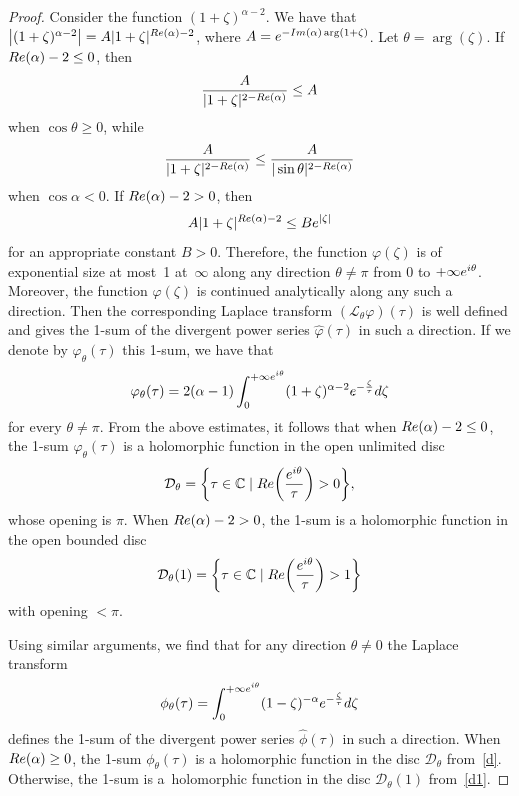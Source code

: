 \documentclass[10pt,a4paper]{article}
\numberwithin{equation}{section}
\begin{document}
\begin{proof}
 Consider the function $(1+\zeta)^{\alpha-2}$. We have that $\bigl|(1+\zeta)^{\alpha-2}\bigr|=A |1+\zeta|^{{\rm Re}(\alpha) -2}$, where
 $A={\rm e}^{-{\rm Im} (\alpha) \arg (1+\zeta)}$. Let $\theta=\arg (\zeta)$. If ${\rm Re} (\alpha) -2 \leq 0$, then
 \[
 \frac{A}{|1+\zeta|^{2 - {\rm Re}(\alpha)}} \leq A
 \]
 when $\cos \theta \geq 0$, while
 \[
 \frac{A}{|1+\zeta|^{2 - {\rm Re}(\alpha)}} \leq \frac{A}{|\sin \theta|^{2 - {\rm Re}(\alpha)}}
 \]
 when $\cos \alpha < 0$. If ${\rm Re} (\alpha) - 2 >0$, then
 \[
 A |1+\zeta|^{{\rm Re}(\alpha) -2} \leq B {\rm e}^{|\zeta|}
 \]
 for an appropriate constant $B > 0$. Therefore, the function $\varphi(\zeta)$ is of exponential size at most~1 at~$\infty$
 along any direction $\theta \neq \pi$ from $0$ to $+\infty {\rm e}^{{\rm i} \theta}$. Moreover, the function $\varphi(\zeta)$ is
 continued analytically along any such a direction. Then the corresponding Laplace transform $(\mathcal{L}_{\theta} \varphi)(\tau)$
 is well defined and gives the 1-sum of the divergent power series $\hat{\varphi}(\tau)$ in such a direction. If we denote
 by $\varphi_{\theta}(\tau)$ this 1-sum, we have that
 \[
 \varphi_{\theta}(\tau)=2 (\alpha-1)
 \int_0^{+\infty {\rm e}^{{\rm i} \theta}}
 (1+\zeta)^{\alpha-2} {\rm e}^{-\frac{\zeta}{\tau}} {\rm d} \zeta
 \]
 for every $\theta \neq \pi$. From the above estimates, it follows that when ${\rm Re} (\alpha) -2 \leq 0$, the 1-sum
 $\varphi_{\theta}(\tau)$ is a holomorphic function in the open unlimited disc
 \begin{equation}
 \mathcal{D}_{\theta}=\biggl\{ \tau\in\mathbb{C} \mid {\rm Re} \biggl(\frac{{\rm e}^{{\rm i} \theta}}{\tau}\biggr) > 0 \biggr\} ,\label{d}
 \end{equation}
 whose opening is $\pi$.
 When ${\rm Re} (\alpha) - 2 > 0$, the 1-sum is a holomorphic function in the open bounded disc
 \begin{equation}
 \mathcal{D}_{\theta}(1)=\biggl\{ \tau\in\mathbb{C} \mid {\rm Re} \biggl(\frac{{\rm e}^{{\rm i} \theta}}{\tau}\biggr) > 1 \biggr\}\label{d1}
 \end{equation}
 with opening $ < \pi$.

 Using similar arguments, we find that for any direction $\theta \neq 0$ the Laplace transform
 \[
 \phi_{\theta}(\tau)=\int_0^{+\infty {\rm e}^{{\rm i} \theta}}
 (1-\zeta)^{-\alpha} {\rm e}^{-\frac{\zeta}{\tau}} {\rm d} \zeta
 \]
 defines the 1-sum of the divergent power series $\hat{\phi}(\tau)$ in such a direction. When ${\rm Re} (\alpha) \geq 0$,
 the 1-sum $\phi_{\theta}(\tau)$ is a holomorphic function in the disc $\mathcal{D}_{\theta}$ from~\eqref{d}. Otherwise, the
 1-sum is a~holomorphic function in the disc $\mathcal{D}_{\theta}(1)$ from~\eqref{d1}.
 \end{proof}
\end{document}
